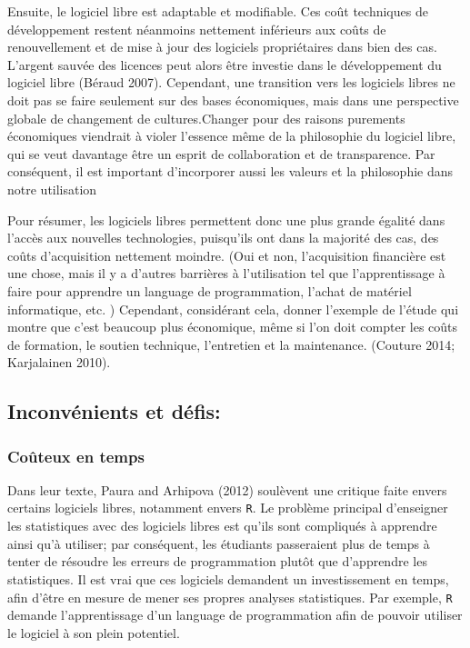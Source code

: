 \documentclass[
  letterpaper,
]{scrbook}
\begin{document}
Ensuite, le logiciel libre est adaptable et modifiable. Ces coût
techniques de développement restent néanmoins nettement inférieurs aux
coûts de renouvellement et de mise à jour des logiciels propriétaires
dans bien des cas. L'argent sauvée des licences peut alors être investie
dans le développement du logiciel libre (Béraud 2007). Cependant, une
transition vers les logiciels libres ne doit pas se faire seulement sur
des bases économiques, mais dans une perspective globale de changement
de cultures.Changer pour des raisons purements économiques viendrait à
violer l'essence même de la philosophie du logiciel libre, qui se veut
davantage être un esprit de collaboration et de transparence. Par
conséquent, il est important d'incorporer aussi les valeurs et la
philosophie dans notre utilisation

Pour résumer, les logiciels libres permettent donc une plus grande
égalité dans l'accès aux nouvelles technologies, puisqu'ils ont dans la
majorité des cas, des coûts d'acquisition nettement moindre. (Oui et
non, l'acquisition financière est une chose, mais il y a d'autres
barrières à l'utilisation tel que l'apprentissage à faire pour apprendre
un language de programmation, l'achat de matériel informatique, etc. )
Cependant, considérant cela, donner l'exemple de l'étude qui montre que
c'est beaucoup plus économique, même si l'on doit compter les coûts de
formation, le soutien technique, l'entretien et la maintenance. (Couture
2014; Karjalainen 2010).

\hypertarget{inconvuxe9nients-et-duxe9fis}{%
\subsection{Inconvénients et
défis:}\label{inconvuxe9nients-et-duxe9fis}}

\hypertarget{couxfbteux-en-temps}{%
\subsubsection{Coûteux en temps}\label{couxfbteux-en-temps}}

Dans leur texte, Paura and Arhipova (2012) soulèvent une critique faite
envers certains logiciels libres, notamment envers \texttt{R}. Le
problème principal d'enseigner les statistiques avec des logiciels
libres est qu'ils sont compliqués à apprendre ainsi qu'à utiliser; par
conséquent, les étudiants passeraient plus de temps à tenter de résoudre
les erreurs de programmation plutôt que d'apprendre les statistiques. Il
est vrai que ces logiciels demandent un investissement en temps, afin
d'être en mesure de mener ses propres analyses statistiques. Par
exemple, \texttt{R} demande l'apprentissage d'un language de
programmation afin de pouvoir utiliser le logiciel à son plein
potentiel.
\end{document}
